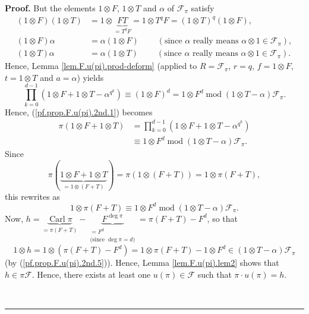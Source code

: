 \documentclass[numbers=enddot,12pt,final,onecolumn,notitlepage]{scrartcl}%
\theoremstyle{definition}
\newenvironment{proof}[1][Proof]{\noindent\textbf{#1.} }{\ \rule{0.5em}{0.5em}}
\let\prodnonlimits\prod
\renewcommand{\prod}{\prodnonlimits\limits}
\begin{document}
\begin{proof}
But the elements $1\otimes F$, $1\otimes T$ and $\alpha$ of $\mathcal{F}_{\pi
}$ satisfy%
\begin{align*}
\left(  1\otimes F\right)  \left(  1\otimes T\right)   &  =1\otimes
\underbrace{FT}_{=T^{q}F}=1\otimes T^{q}F=\left(  1\otimes T\right)
^{q}\left(  1\otimes F\right)  ,\\
\left(  1\otimes F\right)  \alpha &  =\alpha\left(  1\otimes F\right)
\ \ \ \ \ \ \ \ \ \ \left(  \text{since }\alpha\text{ really means }%
\alpha\otimes1\in\mathcal{F}_{\pi}\right)  ,\\
\left(  1\otimes T\right)  \alpha &  =\alpha\left(  1\otimes T\right)
\ \ \ \ \ \ \ \ \ \ \left(  \text{since }\alpha\text{ really means }%
\alpha\otimes1\in\mathcal{F}_{\pi}\right)  .
\end{align*}
Hence, Lemma \ref{lem.F.u(pi).prod-deform} (applied to $R=\mathcal{F}_{\pi}$,
$r=q$, $f=1\otimes F$, $t=1\otimes T$ and $a=\alpha$) yields%
\[
\prod_{k=0}^{d-1}\left(  1\otimes F+1\otimes T-\alpha^{q^{k}}\right)
\equiv\left(  1\otimes F\right)  ^{d}=1\otimes F^{d}\operatorname{mod}\left(
1\otimes T-\alpha\right)  \mathcal{F}_{\pi}.
\]
Hence, (\ref{pf.prop.F.u(pi).2nd.1}) becomes%
\begin{align*}
\pi\left(  1\otimes F+1\otimes T\right)   &  =\prod_{k=0}^{d-1}\left(
1\otimes F+1\otimes T-\alpha^{q^{k}}\right) \\
&  \equiv1\otimes F^{d}\operatorname{mod}\left(  1\otimes T-\alpha\right)
\mathcal{F}_{\pi}.
\end{align*}
Since
\[
\pi\left(  \underbrace{1\otimes F+1\otimes T}_{=1\otimes\left(  F+T\right)
}\right)  =\pi\left(  1\otimes\left(  F+T\right)  \right)  =1\otimes\pi\left(
F+T\right)  ,
\]
this rewrites as%
\begin{equation}
1\otimes\pi\left(  F+T\right)  \equiv1\otimes F^{d}\operatorname{mod}\left(
1\otimes T-\alpha\right)  \mathcal{F}_{\pi}. \label{pf.prop.F.u(pi).2nd.5}%
\end{equation}
Now, $h=\underbrace{\operatorname*{Carl}\pi}_{=\pi\left(  F+T\right)
}-\underbrace{F^{\deg\pi}}_{\substack{=F^{d}\\\text{(since }\deg\pi=d\text{)}%
}}=\pi\left(  F+T\right)  -F^{d}$, so that%
\[
1\otimes h=1\otimes\left(  \pi\left(  F+T\right)  -F^{d}\right)  =1\otimes
\pi\left(  F+T\right)  -1\otimes F^{d}\in\left(  1\otimes T-\alpha\right)
\mathcal{F}_{\pi}%
\]
(by (\ref{pf.prop.F.u(pi).2nd.5})). Hence, Lemma \ref{lem.F.u(pi).lem2} shows
that $h\in\pi\mathcal{F}$. Hence, there exists at least one $u\left(
\pi\right)  \in\mathcal{F}$ such that $\pi\cdot u\left(  \pi\right)  =h$.

\end{proof}
\end{document}
